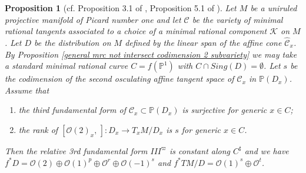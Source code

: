 \documentclass[12pt]{amsart}
\theoremstyle{plain}
\newtheorem{proposition}[theorem]{Proposition}
\theoremstyle{definition}
\begin{document}
\begin{proposition} [cf. Proposition 3.1 of \cite{Mk08}, Proposition 5.1 of \cite{HH}]  \label{parallel transport of III}
Let $M$ be a uniruled projective manifold of Picard number one and let  $ \mathcal C$ be the variety of minimal rational tangents associated to a choice of a minimal rational component $\mathcal K$ on $M$.
 Let $D$ be the distribution on $M$ defined by the linear span of the affine cone $\widehat{\mathcal C}_x$.
By Proposition \ref{general mrc not intersect  codimension 2 subvariety} we may take a standard minimal rational curve $C=f(\mathbb P^1)$ with $C \cap Sing(D) =\emptyset$.
 Let $s$ be the codimension of the second osculating affine tangent space of $\mathcal C_x$ in $\mathbb P(D_x)$.
 Assume that
  \begin{enumerate}
   \item the third fundamental form of $\mathcal C_x \subset \mathbb P(D_x)$ is surjective for generic $x \in C$;

   \item the rank of $[\mathcal O(2)_x, \,]: D_x \rightarrow T_xM/D_x$ is $s$ for generic $x \in C$.
\end{enumerate}

Then the relative 3rd fundamental form  $III^{\varpi}$ is constant along $C^{\sharp}$
and we have  $f^*D =\mathcal O(2) \oplus \mathcal O(1)^p \oplus \mathcal O^r \oplus \mathcal O(-1)^s$ and $f^*TM/D =\mathcal O(1)^s \oplus \mathcal O^t$.

\end{proposition}
\end{document}
